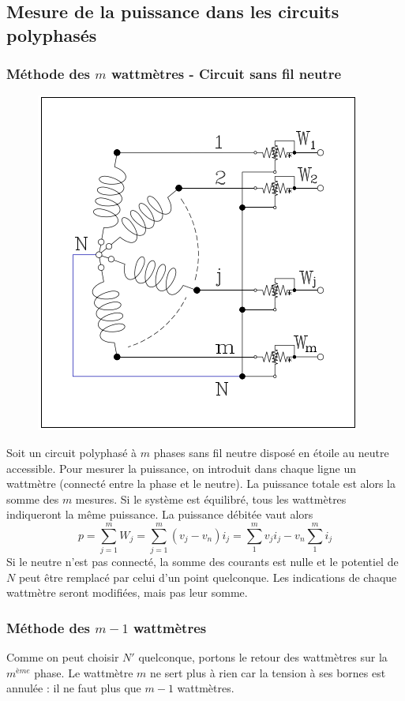 \subsection{Mesure de la puissance dans les circuits polyphasés}
\subsubsection{Méthode des $m$ wattmètres - Circuit sans fil neutre}
\begin{figure}
	\vspace{-11mm}
	\includegraphics[scale=0.4]{ch1/image11.png}
\end{figure}
Soit un circuit polyphasé à $m$ phases sans fil neutre disposé en 
étoile au neutre accessible. Pour mesurer la puissance, on introduit 
dans chaque ligne un wattmètre (connecté entre la phase et le neutre). 
La puissance totale est alors la somme des $m$ mesures. Si le système 
est équilibré, tous les wattmètres indiqueront la même puissance. La 
puissance débitée vaut alors
\begin{equation}
	p = \sum_{j=1}^m W_j = \sum_{j=1}^m (v_j-v_n)i_j = \sum_1^m v_ji_j -
	v_n\sum_1^m i_j
\end{equation}
Si le neutre n'est pas connecté, la somme des courants est nulle et le 
potentiel de $N$ peut être remplacé par celui d'un point quelconque. Les 
indications de chaque wattmètre seront modifiées, mais pas leur somme.
		
\subsubsection{Méthode des $m-1$ wattmètres}
Comme on peut choisir $N'$ quelconque, portons le retour des wattmètres 
sur la $m^{ème}$ phase. Le wattmètre $m$ ne sert plus à rien car la 
tension à ses bornes est annulée : il ne faut plus que $m-1$ wattmètres.
		
